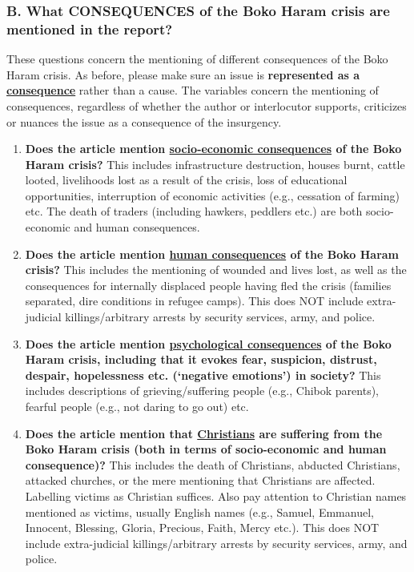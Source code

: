\subsubsection{B.	What CONSEQUENCES of the Boko Haram crisis are mentioned in the report?}

These questions concern the mentioning of different consequences of the Boko Haram crisis. As before, please make sure an issue is \textbf{represented as a \underline{consequence}} rather than a cause. The variables concern the mentioning of consequences, regardless of whether the author or interlocutor supports, criticizes or nuances the issue as a consequence of the insurgency.

\begin{enumerate}[noitemsep, font=\bfseries]
    \item \textbf{Does the article mention \underline{socio-economic consequences} of the Boko Haram crisis?} This includes infrastructure destruction, houses burnt, cattle looted, livelihoods lost as a result of the crisis, loss of educational opportunities, interruption of economic activities (e.g., cessation of farming) etc. The death of traders (including hawkers, peddlers etc.) are both socio-economic and human consequences.
    \item \textbf{Does the article mention \underline{human consequences} of the Boko Haram crisis?} This includes the mentioning of wounded and lives lost, as well as the consequences for internally displaced people having fled the crisis (families separated, dire conditions in refugee camps). This does NOT include extra-judicial killings/arbitrary arrests by security services, army, and police.
    \item \textbf{Does the article mention \underline{psychological consequences} of the Boko Haram crisis, including that it evokes fear, suspicion, distrust, despair, hopelessness etc. (‘negative emotions’) in society? }This includes descriptions of grieving/suffering people (e.g., Chibok parents), fearful people (e.g., not daring to go out) etc.
    \item \textbf{Does the article mention that \underline{Christians} are suffering from the Boko Haram crisis (both in terms of socio-economic and human consequence)?} This includes the death of Christians, abducted Christians, attacked churches, or the mere mentioning that Christians are affected. Labelling victims as Christian suffices. Also pay attention to Christian names mentioned as victims, usually English names (e.g., Samuel, Emmanuel, Innocent, Blessing, Gloria, Precious, Faith, Mercy etc.). This does NOT include extra-judicial killings/arbitrary arrests by security services, army, and police.

\end{enumerate}
